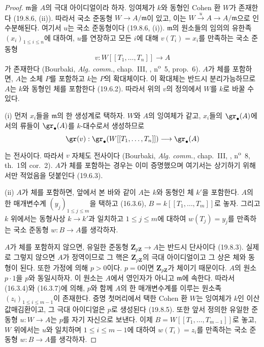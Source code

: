 \begin{proof}
$\mathfrak m$을 $A$의 극대 아이디얼이라 하자. 잉여체가 $k$와 동형인
Cohen 환 $W$가 존재한다 (19.8.6, (ii)). 따라서 국소 준동형
$W\to A/\mathfrak m$이 있고, 이는
$W\xrightarrow{u}A\to A/\mathfrak m$으로 인수분해된다. 여기서 $u$는
국소 준동형이다 (19.8.6, (i)). $\mathfrak m$의 원소들의 임의의 유한족
$(x_i)_{1\leq i\leq n}$에 대하여, $u$를 연장하고 모든 $i$에 대해
$v(T_i)=x_i$를 만족하는 국소 준동형
\[
  v:W[[T_1,\ldots,T_n]]\longrightarrow A
\]
가 존재한다 (Bourbaki, \emph{Alg. comm.}, chap.~III, ,
n\textsuperscript{o}~5, prop.~6). $A$가 체를 포함하면, $A$는 소체
$P$를 포함하고 $k$는 $P$의 확대체이다. 이 확대체는 반드시
분리가능하므로 $A$는 $k$와 동형인 체를 포함한다 (19.6.2). 따라서
위의 $v$의 정의에서 $W$를 $k$로 바꿀 수 있다.

\medskip
\noindent(i)\enspace
먼저 $x_i$들을 $\mathfrak m$의 한 생성계로 택하자. $W$와 $A$의
잉여체가 같고, $x_i$들의 $\gr_\bullet(A)$에서의 류들이
$\gr_\bullet(A)$를 $k$-대수로서 생성하므로
\[
  \gr(v):\gr_\bullet(W[[T_1,\ldots,T_n]])
  \longrightarrow\gr_\bullet(A)
\]
는 전사이다. 따라서 $v$ 자체도 전사이다 (Bourbaki,
\emph{Alg. comm.}, chap.~III, ,
n\textsuperscript{o}~8, th.~1의 cor.~2). $A$가 체를 포함하는 경우는
이미 증명했으며 여기서는 상기하기 위해서만 적었음을 덧붙인다
(19.6.3).

\medskip
\noindent(ii)\enspace
$A$가 체를 포함하면, 앞에서 본 바와 같이 $A$는 $k$와 동형인 체
$k'$을 포함한다. $A$의 한 매개변수계
$(y_j)_{1\leq j\leq m}$을 택하고 (16.3.6),
$B=k[[T_1,\ldots,T_m]]$로 놓자. 그리고 $k$ 위에서는 동형사상
$k\to k'$과 일치하고 $1\leq j\leq m$에 대하여 $w(T_j)=y_j$를
만족하는 국소 준동형 $w:B\to A$를 생각하자.

$A$가 체를 포함하지 않으면, 유일한 준동형
$\mathbf Z_{p\mathbf Z}\to A$는 반드시 단사이다 (19.8.3). 실제로
그렇지 않으면 $A$가 정역이므로 그 핵은 $\mathbf Z_{p\mathbf Z}$의
극대 아이디얼이고 그 상은 체와 동형이 된다. 또한 가정에 의해
$p>0$이다. $p=0$이면 $\mathbf Z_{p\mathbf Z}$가 체이기 때문이다.
$A$의 원소 $p\cdot1$을 $p$와 동일시하자. 이 원소는 $A$에서 영인자가
아니고 $\mathfrak m$에 속한다. 따라서 (16.3.4)와 (16.3.7)에 의해,
$p$와 함께 $A$의 한 매개변수계를 이루는 원소족
$(z_i)_{1\leq i\leq m-1}$이 존재한다. 증명 첫머리에서 택한 Cohen 환
$W$는 잉여체가 $k$인 이산 값매김환이고, 그 극대 아이디얼은 $p$로
생성된다 (19.8.5). 또한 앞서 정의한 유일한 준동형 $u:W\to A$는
$p$를 자기 자신으로 보낸다. 이제 $B=W[[T_1,\ldots,T_{m-1}]]$로 놓고,
$W$ 위에서는 $u$와 일치하며 $1\leq i\leq m-1$에 대하여
$w(T_i)=z_i$를 만족하는 국소 준동형 $w:B\to A$를 생각하자.


\end{proof}

